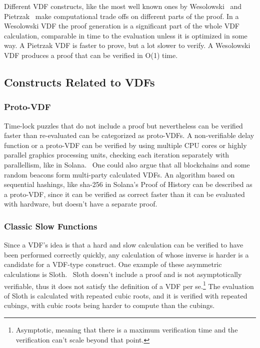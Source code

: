 
Different VDF constructs, like the most well known ones by Wesolowski~\cite{Wesolowski2018} and Pietrzak~\cite{Pietrzak2018} make computational trade offs on different parts of the proof. In a Wesolowski VDF the proof generation is a significant part of the whole VDF calculation, comparable in time to the evaluation unless it is optimized in some way. A Pietrzak VDF is faster to prove, but a lot slower to verify. A Wesolowski VDF produces a proof that can be verified in O(1) time.

\subsection{Constructs Related to VDFs}
\subsubsection{Proto-VDF}
Time-lock puzzles that do not include a proof but nevertheless can be verified faster than re-evaluated can be categorized as proto-VDFs. A non-verifiable delay function or a proto-VDF can be verified by using multiple CPU cores or highly parallel graphics processing units, checking each iteration separately with parallellism, like in Solana.~\cite{Yakovenko2018-zn} One could also argue that all blockchains and some random beacons form multi-party calculated VDFs. An algorithm based on sequential hashings, like sha-256 in Solana's Proof of History can be described as a proto-VDF, since it can be verified as correct faster than it can be evaluated with hardware, but doesn't have a separate proof.

\subsubsection{Classic Slow Functions}
Since a VDF's idea is that a hard and slow calculation can be verified to have been performed correctly quickly, any calculation of whose inverse is harder is a candidate for a VDF-type construct. One example of these asymmetric calculations is Sloth.~\cite{Boneh2018-sm} Sloth doesn't include a proof and is not asymptotically verifiable, thus it does not satisfy the definition of a VDF per se.\footnote{Asymptotic, meaning that there is a maximum verification time and the verification can't scale beyond that point.} The evaluation of Sloth is calculated with repeated cubic roots, and it is verified with repeated cubings, with cubic roots being harder to compute than the cubings.

